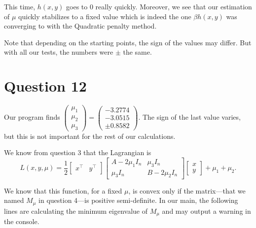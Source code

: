 \documentclass{article}
\newcommand{\tp}{^\top}
\begin{document}
This time, $h(x, y)$ goes to 0 really quickly. Moreover, we see that our estimation of $\mu$ quickly stabilizes to a fixed value which is indeed the one $\beta h(x, y)$ was converging to with the Quadratic penalty method.

Note that depending on the starting points, the sign of the values may differ. But with all our tests, the numbers were $\pm$ the same.


\section*{Question 12}

Our program finds  
$\begin{pmatrix}
\mu_1\\
\mu_2\\
\mu_3
\end{pmatrix} =
\begin{pmatrix}
-3.2774\\
-3.0515\\
\pm 0.8582
\end{pmatrix}$. The sign of the last value varies, but this is not important for the rest of our calculations.

We know from question 3 that the Lagrangian is\\
$$ L(x, y, \mu) = \dfrac{1}{2}
\begin{bmatrix} x\tp & y\tp\end{bmatrix}
\begin{bmatrix} A-2\mu_1 I_n & \mu_3 I_n \\
\mu_3 I_n & B-2\mu_2 I_n \end{bmatrix}
\begin{bmatrix} x \\ y \end{bmatrix}
+ \mu_1 + \mu_2. $$

We know that this function, for a fixed $\mu$, is convex only if the matrix---that we named $M_\mu$ in question 4---is positive semi-definite.
In our main, the following lines are calculating the minimum eigenvalue of $M_\mu$ and may output a warning in the console.


\end{document}
